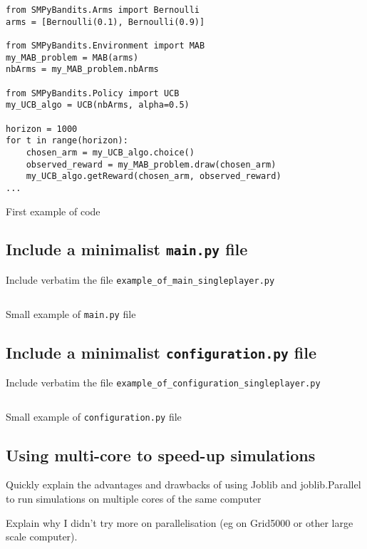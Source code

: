 \begin{listing}[H]
\begin{verbatim}
from SMPyBandits.Arms import Bernoulli
arms = [Bernoulli(0.1), Bernoulli(0.9)]

from SMPyBandits.Environment import MAB
my_MAB_problem = MAB(arms)
nbArms = my_MAB_problem.nbArms

from SMPyBandits.Policy import UCB
my_UCB_algo = UCB(nbArms, alpha=0.5)

horizon = 1000
for t in range(horizon):
    chosen_arm = my_UCB_algo.choice()
    observed_reward = my_MAB_problem.draw(chosen_arm)
    my_UCB_algo.getReward(chosen_arm, observed_reward)
...
\end{verbatim}
\caption{First example of code}
\label{lst:3:example}
\end{listing}

\subsection{Include a minimalist \texttt{main.py} file}

Include verbatim the file
\texttt{example\_of\_main\_singleplayer.py}

\begin{listing}[H]
% 
\inputminted[linenos=true,numbersep=5pt,frame=lines,framesep=2mm]{python3}{2-Chapters/3-Chapter/src/example_of_main_singleplayer.py}
\caption{Small example of \texttt{main.py} file}
\label{lst:3:main}
\end{listing}

\subsection{Include a minimalist \texttt{configuration.py} file}

Include verbatim the file
\texttt{example\_of\_configuration\_singleplayer.py}

\begin{listing}[H]
% 
\inputminted[linenos=true,numbersep=5pt,frame=lines,framesep=2mm]{python3}{2-Chapters/3-Chapter/src/example_of_configuration_singleplayer.py}
\caption{Small example of \texttt{configuration.py} file}
\label{lst:3:configuration}
\end{listing}


\subsection{Using multi-core to speed-up simulations}

Quickly explain the advantages and drawbacks of using Joblib and joblib.Parallel to run simulations on multiple cores of the same computer

Explain why I didn't try more on parallelisation (eg on Grid5000 or other large scale computer).
